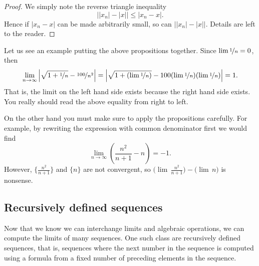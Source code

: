 \documentclass[12pt]{book}
\newcommand{\abs}[1]{\left\lvert {#1} \right\rvert}
\theoremstyle{plain}
\theoremstyle{remark}
\theoremstyle{definition}
\theoremstyle{exercise}
\theoremstyle{example}
\begin{document}
\begin{proof}
We simply note the reverse triangle inequality
\begin{equation*}
\big\lvert \abs{x_n} - \abs{x} \big\rvert \leq \abs{x_n-x} .
\end{equation*}
Hence if $\abs{x_n -x}$ can be made arbitrarily small, so can
$\big\lvert \abs{x_n} - \abs{x} \big\rvert$.
Details are left to the reader.
\end{proof}

Let us see an example putting the above propositions together.  Since
$\lim \nicefrac{1}{n} = 0$, then
\begin{equation*}
\lim_{n\to \infty}
\abs{\sqrt{1 + \nicefrac{1}{n}} - \nicefrac{100}{n^2}} =  
\abs{\sqrt{1 + (\lim \nicefrac{1}{n})} - 100 (\lim \nicefrac{1}{n})(\lim
\nicefrac{1}{n})} = 1.
\end{equation*}
That is, the limit on the left hand side exists because the right hand
side exists.  You really should read the above equality from right to left.

On the other hand you must make sure to apply the propositions carefully.
For example, by rewriting the expression with common denominator first
we would find
\begin{equation*}
\lim_{n\to \infty} \left( \frac{n^2}{n+1} - n \right)
= -1 .
\end{equation*}
However, 
$\bigl\{ \frac{n^2}{n+1} \bigr\}$ and 
$\{n\}$ are not convergent,
so
$\bigl(\lim\, \frac{n^2}{n+1}\bigr) -
\bigl(\lim\, n\bigr)$ is nonsense.

\subsection{Recursively defined sequences}

Now that we know we can interchange limits and algebraic operations, we can
compute the limits of many sequences.
One such class are recursively defined sequences, that is, sequences where
the next number in the sequence is computed using a formula from a fixed number
of preceding elements in the sequence.
\end{document}
